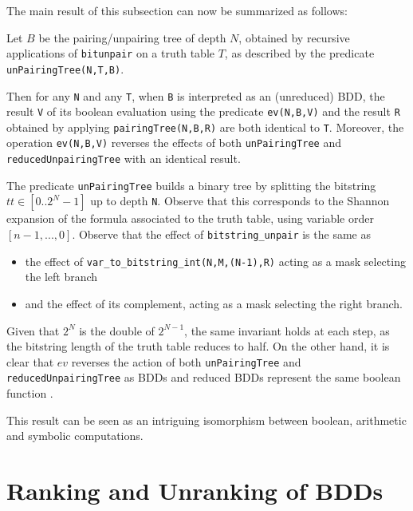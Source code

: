 \documentclass[]{INCLUDES/llncs}
\begin{document}
The main result of this subsection can now be summarized as follows:
\begin{prop} \label{tt}
Let $B$ be the pairing/unpairing tree of depth $N$, obtained by recursive 
applications of {\tt bitunpair} on a truth table $T$, as described
by the predicate {\tt unPairingTree(N,T,B)}.

Then for any {\tt N} and any {\tt T}, when {\tt B} is interpreted as an
(unreduced) BDD, the result {\tt V} of its boolean evaluation using the
predicate {\tt ev(N,B,V)} and
the result {\tt R} obtained by applying {\tt pairingTree(N,B,R)}
are both identical to {\tt T}. Moreover, the operation {\tt ev(N,B,V)}
reverses the effects of both {\tt unPairingTree} and {\tt reducedUnpairingTree} with an 
identical result.
\end{prop}
 The predicate {\tt unPairingTree} builds a binary 
tree by splitting the bitstring $tt \in [0..2^N-1]$ up to depth {\tt N}. 
Observe that this corresponds to the Shannon expansion \cite{shannon_all} of the
formula associated to the truth table, using variable order $[n-1,...,0]$.
Observe that the effect of {\tt bitstring\_unpair} is the same as
\begin{itemize}
  \item the effect of {\tt var\_to\_bitstring\_int(N,M,(N-1),R)} 
     acting as a mask selecting the left branch
\item 
     and the effect of its complement, acting as a mask selecting the right
     branch.
\end{itemize}
Given that $2^N$ is the double of $2^{N-1}$, the same invariant holds at each step, 
as the bitstring length of the truth table reduces to half. On the other hand,
it is clear that {\tt $ev$} reverses the action of both {\tt unPairingTree} and
{\tt reducedUnpairingTree} as BDDs and reduced BDDs represent 
the same boolean function \cite{bryant86graphbased}.

This result can be seen as an intriguing isomorphism between
boolean, arithmetic and symbolic computations.

\section{Ranking and Unranking of BDDs} \label{rank}

\end{document}
